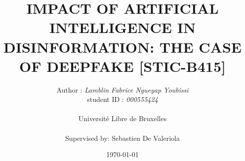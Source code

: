 \title{\textbf{IMPACT OF ARTIFICIAL INTELLIGENCE IN DISINFORMATION:} \textbf{ THE CASE OF DEEPFAKE [STIC-B415]}}

\author{Author : \emph{Lamblin Fabrice Ngueyap Youbissi} \\  student ID : \emph{000555424}
\\ \\ Université Libre de Bruxelles \\ \\ Supervised by: Sebastien De Valeriola }
\date{\today}



\maketitle